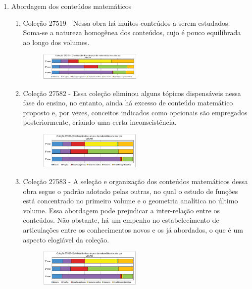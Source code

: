 \documentclass[a4paper, 12pt]{article}
\begin{document}
  \begin{enumerate}
  \item Abordagem dos conteúdos matemáticos
    \begin{enumerate}
      \item Coleção 27519 - Nessa obra há muitos conteúdos a serem estudados. Soma-se a natureza homogênea dos conteúdos, cujo é pouco equilibrada ao longo dos volumes. 
      \begin{figure}[h!]
      \centering
      \includegraphics[width=0.5\textwidth]{1}
      \end{figure}

      \item Coleção 27582 - Essa coleção eliminou alguns tópicos dispensáveis nessa fase do ensino, no entanto, ainda há excesso de conteúdo matemático proposto e, por vezes, conceitos indicados como opcionais são empregados posteriormente, criando uma certa inconscistência.
      \begin{figure}[h!]
      \centering
      \includegraphics[width=0.5\textwidth]{2}
      \end{figure}

      \item Coleção 27583 - A seleção e organização dos conteúdos matemáticos dessa obra segue o padrão adotado pelas outras, no qual o estudo de funções está concentrado no primeiro volume e o geometria analítica no último volume. Essa abordagem pode prejudicar a inter-relação entre os conteúdos. Não obstante, há um empenho no estabelecimento de articulações entre os conhecimentos novos e os já abordados, o que é um aspecto elogiável da coleção.
      \begin{figure}[h!]
      \centering
      \includegraphics[width=0.5\textwidth]{3}
      \end{figure}


\end{enumerate}
\end{enumerate}
\end{document}
